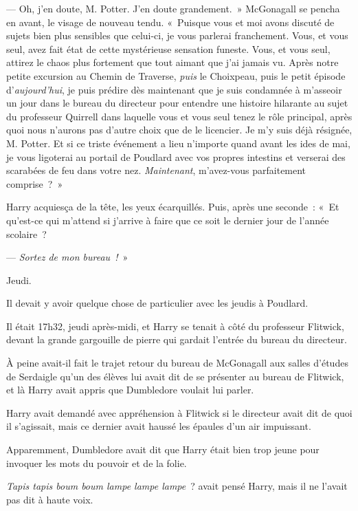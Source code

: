 --- Oh, j'en doute, M. Potter.
J'en doute grandement.~»
McGonagall se pencha en avant, le visage de nouveau tendu.
«~Puisque vous et moi avons discuté de sujets bien plus sensibles que celui-ci, je vous parlerai franchement.
Vous, et vous seul, avez fait état de cette mystérieuse sensation funeste.
Vous, et vous seul, attirez le chaos plus fortement que tout aimant que j'ai jamais vu.
Après notre petite excursion au Chemin de Traverse, \emph{puis} le Choixpeau, puis le petit épisode d'\emph{aujourd'hui}, je puis prédire dès maintenant que je suis condamnée à m'asseoir un jour dans le bureau du directeur pour entendre une histoire hilarante au sujet du professeur Quirrell dans laquelle vous et vous seul tenez le rôle principal, après quoi nous n'aurons pas d'autre choix que de le licencier.
Je m'y suis déjà résignée, M. Potter.
Et si ce triste événement a lieu n'importe quand avant les ides de mai, je vous ligoterai au portail de Poudlard avec vos propres intestins et verserai des scarabées de feu dans votre nez.
\emph{Maintenant}, m'avez-vous parfaitement comprise~?~»

Harry acquiesça de la tête, les yeux écarquillés.
Puis, après une seconde~:
«~Et qu'est-ce qui m'attend si j'arrive à faire que ce soit le dernier jour de l'année scolaire~?

--- \emph{Sortez de mon bureau~!}~»

\later

Jeudi.

Il devait y avoir quelque chose de particulier avec les jeudis à Poudlard.

Il était 17h32, jeudi après-midi, et Harry se tenait à côté du professeur Flitwick, devant la grande gargouille de pierre qui gardait l'entrée du bureau du directeur.

À peine avait-il fait le trajet retour du bureau de McGonagall aux salles d'études de Serdaigle qu'un des élèves lui avait dit de se présenter au bureau de Flitwick, et là Harry avait appris que Dumbledore voulait lui parler.

Harry avait demandé avec appréhension à Flitwick si le directeur avait dit de quoi il s'agissait, mais ce dernier avait haussé les épaules d'un air impuissant.

Apparemment, Dumbledore avait dit que Harry était bien trop jeune pour invoquer les mots du pouvoir et de la folie.

\emph{Tapis tapis boum boum lampe lampe lampe}~? avait pensé Harry, mais il ne l'avait pas dit à haute voix.


